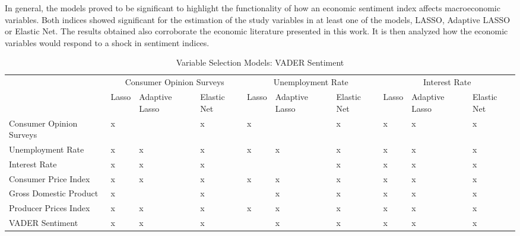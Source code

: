In general, the models proved to be significant to highlight the functionality of how an economic sentiment index affects macroeconomic variables. Both indices showed significant for the estimation of the study variables in at least one of the models, LASSO, Adaptive LASSO or Elastic Net. The results obtained also corroborate the economic literature presented in this work. It is then analyzed how the economic variables would respond to a shock in sentiment indices.

\begin{landscape}
\begin{table}[]
\caption{Variable Selection Models: VADER Sentiment}
\label{tab:selectionvader}
\begin{adjustbox}{max width=\linewidth}
\begin{tabular}{llllllllll}
\hline
                         & \multicolumn{3}{c}{Consumer Opinion   Surveys} & \multicolumn{3}{c}{Unemployment Rate}      & \multicolumn{3}{c}{Interest Rate}         \\
                         & Lasso     & Adaptive Lasso    & Elastic Net    & Lasso    & Adaptive Lasso   & Elastic Net  & Lasso   & Adaptive Lasso   & Elastic Net  \\
Consumer Opinion Surveys & x         &                   & x              & x        &                  & x            & x       & x                & x            \\
Unemployment Rate        & x         & x                 & x              & x        & x                & x            & x       & x                & x            \\
Interest Rate            & x         & x                 & x              &          &                  & x            & x       & x                & x            \\
Consumer Price Index     & x         & x                 & x              & x        & x                & x            & x       & x                & x            \\
Gross Domestic Product   & x         &                   & x              &          & x                & x            & x       & x                & x            \\
Producer Prices Index    & x         & x                 & x              & x        & x                & x            & x       & x                & x            \\ \hline
VADER Sentiment          & x         & x                 & x              &          & x                & x            & x       & x                & x            \\ \hline

\end{tabular}
\end{adjustbox}
\end{table}
\end{landscape}
